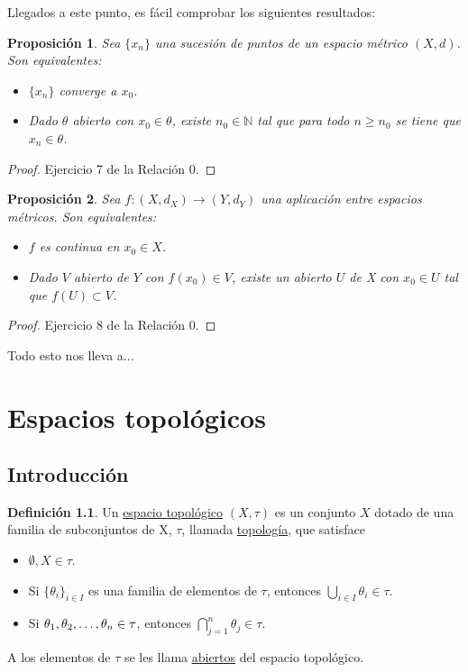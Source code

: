 \documentclass[12pt]{report}
\newtheorem{proposition}{Proposición}[chapter]
\theoremstyle{definition}
\newtheorem{definition}{Definición}[chapter]
\theoremstyle{definition}
\theoremstyle{remark}
\newcommand{\N}{\mathbb N}
\begin{document}
\vspace{2mm}
Llegados a este punto, es fácil comprobar los siguientes resultados:
\begin{proposition}
Sea $\{x_n\}$ una sucesión de puntos de un espacio métrico $(X,d)$. Son equivalentes:
\begin{itemize}
    \item[(i)] $\{x_n\}$ converge a $x_0$.
    \item[(ii)] Dado $\theta$ abierto con $x_0 \in \theta$, existe $n_0 \in \N$ tal que para todo $n \geq n_0$ se tiene que $x_n \in \theta$.
\end{itemize}
\end{proposition}

\begin{proof}
Ejercicio 7 de la Relación 0.
\end{proof}

\begin{proposition}
\label{prop0.4.}
Sea $f \colon (X,d_X) \to (Y,d_Y)$ una aplicación entre espacios métricos. Son equivalentes:
\begin{itemize}
    \item[(i)] $f$ es continua en $x_0 \in X$.
    \item[(ii)] Dado $V$ abierto de $Y$ con $f(x_0) \in V$, existe un abierto $U$ de X con $x_0 \in U$ tal que $f(U) \subset V$.
\end{itemize}
\end{proposition}

\begin{proof}
Ejercicio 8 de la Relación 0.
\end{proof}

Todo esto nos lleva a...

\chapter{Espacios topológicos}

\section{Introducción}

\begin{definition}
Un \underline{espacio topológico} $(X,\tau)$ es un conjunto $X$ dotado de una familia de subconjuntos de X, $\tau$, llamada \underline{topología}, que satisface
\begin{itemize}
    \item[(i)] $\emptyset, X \in \tau$.
    \item[(ii)] Si $\{\theta_i\}_{i \in I}$ es una familia de elementos de $\tau$, entonces $\bigcup_{i \in I}\theta_i \in \tau$.
    \item[(iii)] Si $\theta_1,\theta_2,\mathellipsis,\theta_n \in \tau$, entonces $\bigcap_{j=1}^n\theta_j \in \tau$.
\end{itemize}
A los elementos de $\tau$ se les llama \underline{abiertos} del espacio topológico.
\end{definition}
\end{document}
